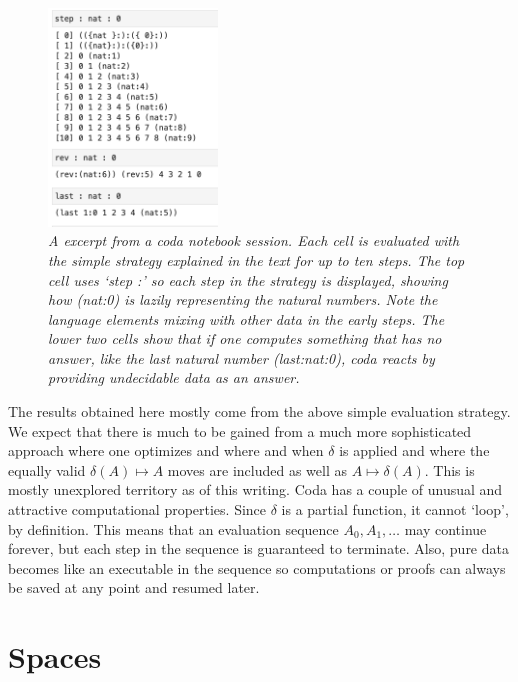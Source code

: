 \documentclass[11pt]{article}
\begin{document}
\begin{figure}[h]
\centering
\includegraphics[width=0.4\textwidth]{nat.png}
\caption{{\it A excerpt from a coda notebook session\cite{github}.  Each cell is evaluated with the simple strategy explained in the text for up to ten
steps.  The top cell uses `step :' so each step in the strategy is displayed, showing how (nat:0) is lazily representing the natural numbers.  Note the language
elements mixing with other data in the early steps. The lower two cells show that if one computes something that has no answer, like the last natural number (last:nat:0), coda reacts by providing undecidable data as an answer.}}
\end{figure}

    The results obtained here mostly come from the above simple evaluation strategy.
We expect that there is much to be gained from a much more sophisticated approach 
where one optimizes and where and when $\delta$ is applied and where the equally valid $\delta(A)\mapsto A$ moves are included as well
as $A\mapsto\delta(A)$.  This is mostly unexplored territory as of this writing.  Coda has a couple of unusual and attractive computational properties.
Since $\delta$ is a partial function, it cannot `loop', by definition.  This means that an evaluation sequence $A_0,A_1,\dots$ may continue forever,
but each step in the sequence is guaranteed to terminate.  Also, pure data becomes like an executable in the sequence so computations or
proofs can always be saved at any point and resumed later.

\section{Spaces}
\end{document}
